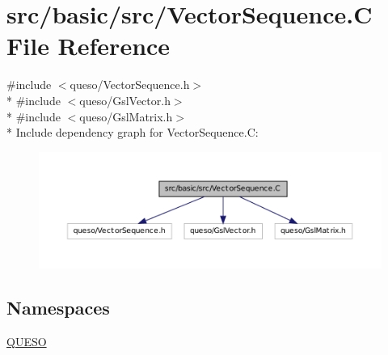 \hypertarget{_vector_sequence_8_c}{\section{src/basic/src/\-Vector\-Sequence.C File Reference}
\label{_vector_sequence_8_c}
}
{\ttfamily \#include $<$queso/\-Vector\-Sequence.\-h$>$}\\*
{\ttfamily \#include $<$queso/\-Gsl\-Vector.\-h$>$}\\*
{\ttfamily \#include $<$queso/\-Gsl\-Matrix.\-h$>$}\\*
Include dependency graph for Vector\-Sequence.\-C\-:
\nopagebreak
\begin{figure}[H]
\begin{center}
\leavevmode
\includegraphics[width=350pt]{_vector_sequence_8_c__incl}
\end{center}
\end{figure}
\subsection*{Namespaces}
\begin{DoxyCompactItemize}
\item 
\hyperlink{namespace_q_u_e_s_o}{Q\-U\-E\-S\-O}
\end{DoxyCompactItemize}

